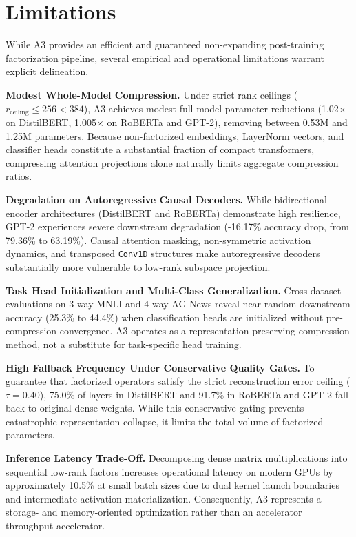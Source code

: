 \section{Limitations}
\label{sec:limitations}

While A3 provides an efficient and guaranteed non-expanding post-training factorization pipeline, several empirical and operational limitations warrant explicit delineation.

\textbf{Modest Whole-Model Compression.} Under strict rank ceilings ($r_{\mathrm{ceiling}} \le 256 < 384$), A3 achieves modest full-model parameter reductions (1.02$\times$ on DistilBERT, 1.005$\times$ on RoBERTa and GPT-2), removing between 0.53M and 1.25M parameters. Because non-factorized embeddings, LayerNorm vectors, and classifier heads constitute a substantial fraction of compact transformers, compressing attention projections alone naturally limits aggregate compression ratios.

\textbf{Degradation on Autoregressive Causal Decoders.} While bidirectional encoder architectures (DistilBERT and RoBERTa) demonstrate high resilience, GPT-2 experiences severe downstream degradation (-16.17\% accuracy drop, from 79.36\% to 63.19\%). Causal attention masking, non-symmetric activation dynamics, and transposed \texttt{Conv1D} structures make autoregressive decoders substantially more vulnerable to low-rank subspace projection.

\textbf{Task Head Initialization and Multi-Class Generalization.} Cross-dataset evaluations on 3-way MNLI and 4-way AG News reveal near-random downstream accuracy (25.3\% to 44.4\%) when classification heads are initialized without pre-compression convergence. A3 operates as a representation-preserving compression method, not a substitute for task-specific head training.

\textbf{High Fallback Frequency Under Conservative Quality Gates.} To guarantee that factorized operators satisfy the strict reconstruction error ceiling ($\tau = 0.40$), 75.0\% of layers in DistilBERT and 91.7\% in RoBERTa and GPT-2 fall back to original dense weights. While this conservative gating prevents catastrophic representation collapse, it limits the total volume of factorized parameters.

\textbf{Inference Latency Trade-Off.} Decomposing dense matrix multiplications into sequential low-rank factors increases operational latency on modern GPUs by approximately 10.5\% at small batch sizes due to dual kernel launch boundaries and intermediate activation materialization. Consequently, A3 represents a storage- and memory-oriented optimization rather than an accelerator throughput accelerator.

